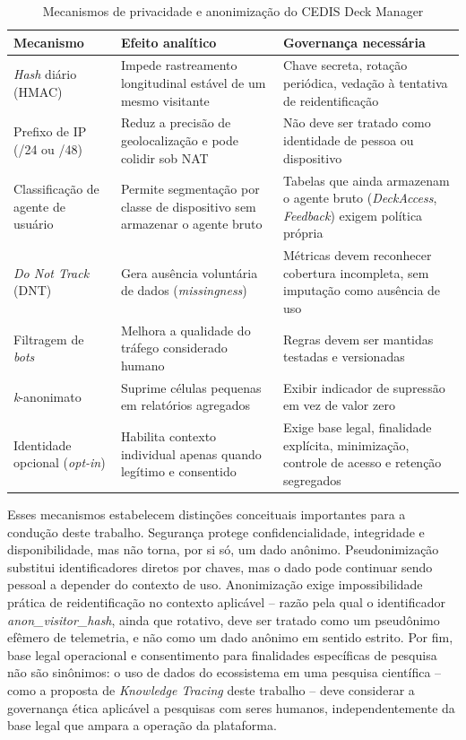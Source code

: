 \begin{table}[htb]
\caption{Mecanismos de privacidade e anonimização do CEDIS Deck Manager}
\label{tab:privacidade-deck-manager}
\centering
\begin{tabularx}{\textwidth}{l>{\raggedright\arraybackslash}X>{\raggedright\arraybackslash}X}
\hline
\textbf{Mecanismo} & \textbf{Efeito analítico} & \textbf{Governança necessária} \\
\hline
\textit{Hash} diário (HMAC) & Impede rastreamento longitudinal estável de um mesmo visitante & Chave secreta, rotação periódica, vedação à tentativa de reidentificação \\
\hline
Prefixo de IP (/24 ou /48) & Reduz a precisão de geolocalização e pode colidir sob NAT & Não deve ser tratado como identidade de pessoa ou dispositivo \\
\hline
Classificação de agente de usuário & Permite segmentação por classe de dispositivo sem armazenar o agente bruto & Tabelas que ainda armazenam o agente bruto (\textit{DeckAccess}, \textit{Feedback}) exigem política própria \\
\hline
\textit{Do Not Track} (DNT) & Gera ausência voluntária de dados (\textit{missingness}) & Métricas devem reconhecer cobertura incompleta, sem imputação como ausência de uso \\
\hline
Filtragem de \textit{bots} & Melhora a qualidade do tráfego considerado humano & Regras devem ser mantidas testadas e versionadas \\
\hline
\textit{k}-anonimato & Suprime células pequenas em relatórios agregados & Exibir indicador de supressão em vez de valor zero \\
\hline
Identidade opcional (\textit{opt-in}) & Habilita contexto individual apenas quando legítimo e consentido & Exige base legal, finalidade explícita, minimização, controle de acesso e retenção segregados \\
\hline
\end{tabularx}
\end{table}

Esses mecanismos estabelecem distinções conceituais importantes para a
condução deste trabalho. Segurança protege confidencialidade, integridade
e disponibilidade, mas não torna, por si só, um dado anônimo.
Pseudonimização substitui identificadores diretos por chaves, mas o dado
pode continuar sendo pessoal a depender do contexto de uso. Anonimização
exige impossibilidade prática de reidentificação no contexto aplicável --
razão pela qual o identificador \textit{anon\_visitor\_hash}, ainda que
rotativo, deve ser tratado como um pseudônimo efêmero de telemetria, e não
como um dado anônimo em sentido estrito. Por fim, base legal operacional e
consentimento para finalidades específicas de pesquisa não são
sinônimos: o uso de dados do ecossistema em uma pesquisa científica --
como a proposta de \textit{Knowledge Tracing} deste trabalho -- deve
considerar a governança ética aplicável a pesquisas com seres humanos,
independentemente da base legal que ampara a operação da plataforma.

